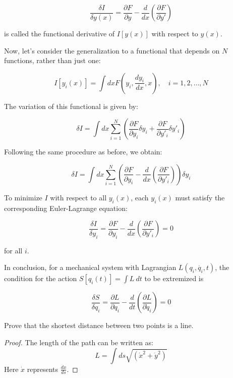 \begin{equation}
    \frac{\delta I}{\delta y(x)} = \frac{\partial F}{\partial y} - \frac{d}{dx} \left(\frac{\partial F}{\partial y'}\right)
\end{equation}

is called the functional derivative of $I[y(x)]$ with respect to $y(x)$.

Now, let's consider the generalization to a functional that depends on $N$ functions, 
rather than just one:

\begin{equation}
    I[y_i(x)] = \int dx F(y_i, \frac{dy_i}{dx}, x), \quad i = 1, 2, \dots, N
\end{equation}

The variation of this functional is given by:

\begin{equation}
    \delta I = \int dx \sum_{i=1}^{N} \left( \frac{\partial F}{\partial y_i} \delta y_i + \frac{\partial F}{\partial y'_i} \delta y'_i \right)
\end{equation}

Following the same procedure as before, we obtain:

\begin{equation}
    \delta I = \int dx \sum_{i=1}^{N} \left( \frac{\partial F}{\partial y_i} - \frac{d}{dx} \left(\frac{\partial F}{\partial y'_i}\right) \right) \delta y_i
\end{equation}

To minimize $I$ with respect to all $y_i(x)$, each $y_i(x)$ must satisfy the 
corresponding Euler-Lagrange equation:

\begin{equation}
    \frac{\delta I}{\delta y_i} = \frac{\partial F}{\partial y_i} - \frac{d}{dx} \left(\frac{\partial F}{\partial y'_i}\right) = 0
\end{equation}

for all $i$.

In conclusion, for a mechanical system with Lagrangian $L\left(q_i, \dot{q_i}, t\right)$,
the condition for the action $S[q_i(t)] = \int L\ dt$ to be extremized is

\begin{equation}
    \frac{\delta S}{\delta q_i} = \frac{\partial L}{\partial q_i} - \frac{d}{dt} \left(\frac{\partial L}{\partial \dot{q}_i}\right) = 0
\end{equation}

\begin{example}
    Prove that the shortest distance between two points is a line.
\end{example}

\begin{proof}
    The length of the path can be written as:
    \begin{equation}
        L = \int ds \sqrt{\left(\dot{x}^2 + \dot{y}^2\right)}
    \end{equation}
    Here $\dot{x}$ represents $\frac{dx}{ds}$.


\end{proof}
